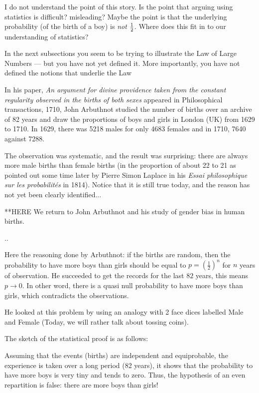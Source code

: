 {\Arny I do not understand the point of this story.  Is the point that arguing using statistics is
difficult? misleading?  Maybe the point is that the underlying probability (of the birth of a boy)
is {\em not} ${1 \over 2}$.  Where does this fit in to our understanding of statistics?}


{\Arny In the next subsections you seem to be trying to illustrate the Law of Large Numbers --- but
you have not yet defined it.  More importantly, you have not defined the notions that underlie the
Law}

In his paper,
\textit{An argument for divine providence taken from the constant regularity observed in the births of both sexes}
appeared in Philosophical transactions, 1710, 
John Arbuthnot studied the number of births over an archive of 82 years and draw the proportions of boys and girls
in London (UK) from 1629 to 1710. 
In 1629, there was  5218 males for only 4683 females and in 1710, 7640 against 7288. 
 
The observation was systematic, and the result was surprising: there are always more male births than female births
(in the proportion of about 22 to 21 as pointed out some time later by Pierre Simon Laplace in his 
\textit{Essai philosophique sur les probabilités} in 1814). 
Notice that it is still true today, and the reason has not yet been clearly identified...


**HERE
We return to John Arbuthnot and his study of gender bias in human births.

..

Here the reasoning done by Arbuthnot:
if the births are random, then the probability to have more boys than girls should be equal to 
$p=(\frac{1}{2})^{n}$ for $n$ years of observation.
He succeeded to get the records for the last $82$ years, this means $p \rightarrow 0$.
In other word, there is a quasi null probability to have more boys than girls, which contradicts the observations. 

He looked at this problem by using an analogy with 2 face dices labelled Male and Female
(Today, we will rather talk about tossing coins). 
\medskip

The sketch of the statistical proof is as follows:

Assuming that the events (births) are independent and equiprobable,
the experience is taken over a long period (82 years), it shows that the probability to have more boys is very tiny and
tends to zero. 
Thus, the hypothesis of an even repartition is false: there are more boys than girls!
\medskip


